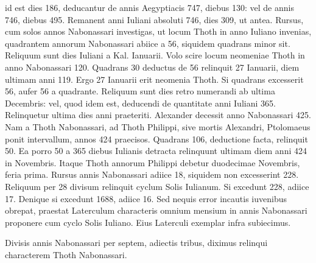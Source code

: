 id est dies 186, deducantur de annis Aegyptiacis 747, diebus 130:
vel de annis 746, diebus 495.
Remanent anni Iuliani absoluti 746,
dies 309, ut antea.
Rursus, cum solos annos Nabonassari investigas,
ut locum Thoth in anno Iuliano invenias, quadrantem annorum
Nabonassari abiice a 56, siquidem quadrans minor sit.
Reliquum
sunt dies Iuliani a Kal. Ianuarii.
Volo scire locum neomeniae Thoth
in anno Nabonassari 120.
Quadrans 30 deductus de 56 relinquit
27 Ianuarii, diem ultimam anni 119.
Ergo 27 Ianuarii erit neomenia
Thoth.
Si quadrans excesserit 56, aufer 56 a quadrante.
Reliquum
sunt dies retro numerandi ab ultima Decembris: vel, quod
idem est, deducendi de quantitate anni Iuliani 365.
Relinquetur ultima
dies anni praeteriti.
Alexander decessit anno Nabonassari 425.
Nam a Thoth Nabonassari, ad Thoth Philippi, sive mortis Alexandri,
Ptolomaeus ponit intervallum, annos 424 praecisos.
Quadrans
106, deductione facta, relinquit 50.
Ea porro 50 a 365
diebus Iulianis detracta relinquunt ultimam diem anni 424
in  Novembris.
Itaque Thoth annorum Philippi debetur
duodecimae Novembris, feria prima.
Rursus annis Nabonassari
adiice 18,
siquidem non excesserint 228.
Reliquum per 28
divisum relinquit cyclum Solis Iulianum.
Si excedunt 228, adiice
17.
Denique si excedunt 1688, adiice 16.
Sed nequis error
incautis iuvenibus obrepat, praestat Laterculum characteris omnium
mensium in annis Nabonassari proponere cum cyclo Solis
Iuliano.
%
Eius Laterculi exemplar infra subiecimus.
%
\begin{table}[tbp]
  
\end{table}
%
Divisis annis
Nabonassari per septem, adiectis tribus, diximus relinqui characterem
Thoth Nabonassari.






























